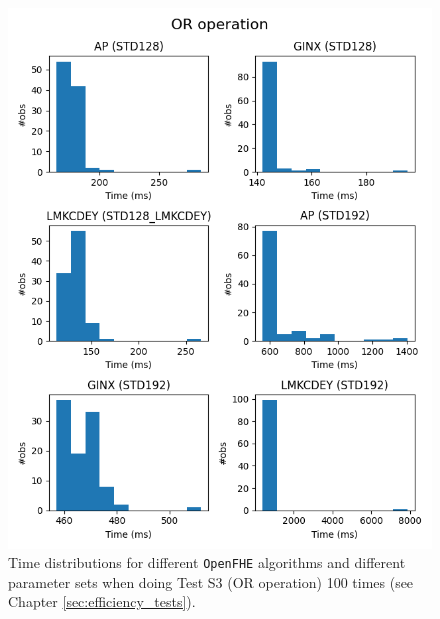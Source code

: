 \begin{figure}[ht]
    \centering
    \includegraphics[width=\textwidth]{data/figures/OR_operation_distributions_1.png}
    \caption{Time distributions for different \texttt{OpenFHE} algorithms and different parameter sets when doing Test S3 (OR operation) 100 times (see Chapter \ref{sec:efficiency_tests}).}
    \label{fig:distr_or1}
\end{figure}

